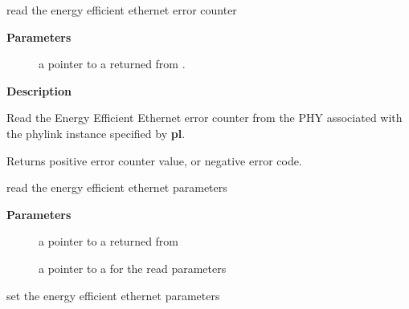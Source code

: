 \documentclass[a4paper,8pt,english]{sphinxmanual}
\begin{document}
\begin{fulllineitems}
\label{networking/kapi:c.phylink_get_eee_err}
read the energy efficient ethernet error counter

\end{fulllineitems}


\textbf{Parameters}
\begin{description}
\item[{}] \leavevmode
a pointer to a {\hyperref[networking/kapi:c.phylink]{\emph{}}} returned from {\hyperref[networking/kapi:c.phylink_create]{\emph{}}}.

\end{description}

\textbf{Description}

Read the Energy Efficient Ethernet error counter from the PHY associated
with the phylink instance specified by \textbf{pl}.

Returns positive error counter value, or negative error code.

\begin{fulllineitems}
\label{networking/kapi:c.phylink_ethtool_get_eee}
read the energy efficient ethernet parameters

\end{fulllineitems}


\textbf{Parameters}
\begin{description}
\item[{}] \leavevmode
a pointer to a {\hyperref[networking/kapi:c.phylink]{\emph{}}} returned from {\hyperref[networking/kapi:c.phylink_create]{\emph{}}}

\item[{}] \leavevmode
a pointer to a  for the read parameters

\end{description}

\begin{fulllineitems}
\label{networking/kapi:c.phylink_ethtool_set_eee}
set the energy efficient ethernet parameters

\end{fulllineitems}
\end{document}
